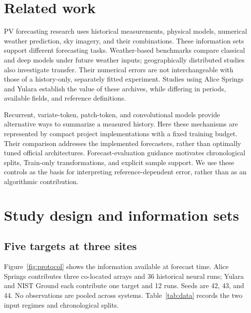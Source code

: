 \documentclass[aip,reprint,floatfix,amsmath,amssymb]{revtex4-2}
\begin{document}
\section{Related work}
PV forecasting research uses historical measurements, physical models, numerical weather prediction, sky imagery, and their combinations. These information sets support different forecasting tasks.\cite{Antonanzas2016,Mellit2021Review,DiLeo2025Review} Weather-based benchmarks compare classical and deep models under future weather inputs; geographically distributed studies also investigate transfer.\cite{Markovics2026,SolNet2025} Their numerical errors are not interchangeable with those of a history-only, separately fitted experiment. Studies using Alice Springs and Yulara establish the value of these archives, while differing in periods, available fields, and reference definitions.\cite{Mahmud2021,Huang2024MANODE,Mansour2026}

Recurrent, variate-token, patch-token, and convolutional models provide alternative ways to summarize a measured history.\cite{Hewamalage2021RNN,Liu2024iTransformer,Nie2023PatchTST,Luo2024ModernTCN} Here these mechanisms are represented by compact project implementations with a fixed training budget. Their comparison addresses the implemented forecasters, rather than optimally tuned official architectures. Forecast-evaluation guidance motivates chronological splits, Train-only transformations, and explicit sample support.\cite{Tashman2000,Bergmeir2012,Hewamalage2023,Kapoor2023} We use these controls as the basis for interpreting reference-dependent error, rather than as an algorithmic contribution.

\section{Study design and information sets}
\subsection{Five targets at three sites}
Figure~\ref{fig:protocol} shows the information available at forecast time. Alice Springs contributes three co-located arrays and 36 historical neural runs; Yulara and NIST Ground each contribute one target and 12 runs. Seeds are 42, 43, and 44. No observations are pooled across systems. Table~\ref{tab:data} records the two input regimes and chronological splits.
\end{document}
